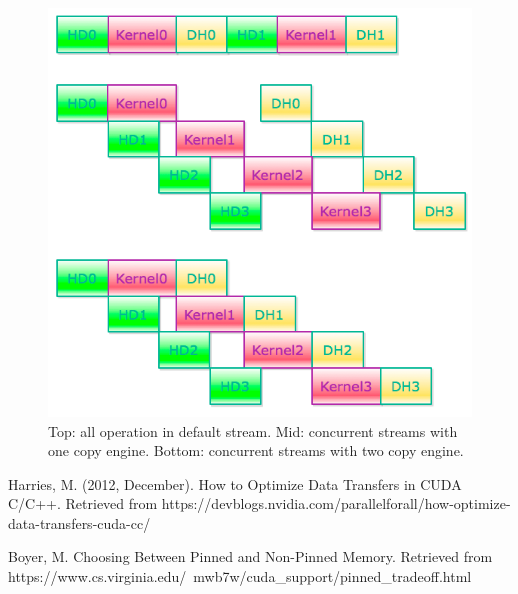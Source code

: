 \documentclass[journal,12pt,onecolumn,draftclsnofoot]{ieeeconf}  %
\begin{document}
\begin{figure}[h]
	\centering\includegraphics[width=120mm]{concurrent.png}
	\caption{Top: all operation in default stream. Mid: concurrent streams with one copy engine. Bottom: concurrent streams with two copy engine.}
	\label{Top: all operation in default stream. Mid: concurrent streams with one copy engine. Bottom: concurrent streams with two copy engine.}
\end{figure}


\begin{thebibliography}{9}
Harries, M. (2012, December). How to Optimize Data Transfers in CUDA C/C++. Retrieved from https://devblogs.nvidia.com/parallelforall/how-optimize-data-transfers-cuda-cc/
	
Boyer, M. Choosing Between Pinned and Non-Pinned Memory. Retrieved from https://www.cs.virginia.edu/~mwb7w/cuda_support/pinned_tradeoff.html
	
	

\end{thebibliography}
\end{document}
